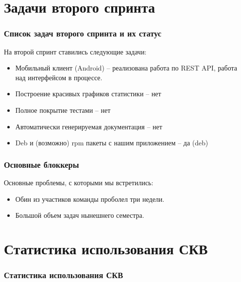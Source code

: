 \documentclass{beamer}
\newlength{\wideitemsep}
\let\olditem\item
\renewcommand{\item}{\setlength{\itemsep}{\wideitemsep}\olditem}
\begin{document}
\section{Задачи второго спринта}

\begin{frame}
\frametitle{Список задач второго спринта и их статус}

На второй спринт ставились следующие задачи:
\begin{itemize}
\item Мобильный клиент (Android) -- реализована работа по REST API, работа над интерфейсом в процессе.
\item Построение красивых графиков статистики -- нет
\item Полное покрытие тестами -- нет
\item Автоматически генерируемая документация -- нет
\item Deb и (возможно) rpm пакеты с нашим приложением -- да (deb)
\end{itemize}

\end{frame}



\begin{frame}
\frametitle{Основные блоккеры}

Основные проблемы, с которыми мы встретились:
\begin{itemize}
\item Обин из участиков команды проболел три недели.
\item Большой объем задач нынешнего семестра.
\end{itemize}


\end{frame}

\section{Статистика использования СКВ}

\begin{frame}
\frametitle{Статистика использования СКВ}


\end{frame}
\end{document}
